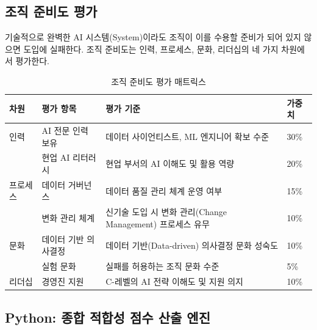 \subsection{조직 준비도 평가}
\label{sec:8.1.4}

기술적으로 완벽한 AI 시스템(System)이라도 조직이 이를 수용할 준비가 되어 있지 않으면 도입에 실패한다. 조직 준비도는 인력, 프로세스, 문화, 리더십의 네 가지 차원에서 평가한다.

\begin{table}[htbp]
\centering
\caption{조직 준비도 평가 매트릭스}
\label{tab:org_readiness}
\begin{tabularx}{\textwidth}{p{2cm}p{3cm}Xp{2cm}}
\toprule
\textbf{차원} & \textbf{평가 항목} & \textbf{평가 기준} & \textbf{가중치} \\
\midrule
인력 & AI 전문 인력 보유 & 데이터 사이언티스트, ML 엔지니어 확보 수준 & 30\% \\
& 현업 AI 리터러시 & 현업 부서의 AI 이해도 및 활용 역량 & 20\% \\
\midrule
프로세스 & 데이터 거버넌스 & 데이터 품질 관리 체계 운영 여부 & 15\% \\
& 변화 관리 체계 & 신기술 도입 시 변화 관리(Change Management) 프로세스 유무 & 10\% \\
\midrule
문화 & 데이터 기반 의사결정 & 데이터 기반(Data-driven) 의사결정 문화 성숙도 & 10\% \\
& 실험 문화 & 실패를 허용하는 조직 문화 수준 & 5\% \\
\midrule
리더십 & 경영진 지원 & C-레벨의 AI 전략 이해도 및 지원 의지 & 10\% \\
\bottomrule
\end{tabularx}
\end{table}

\subsection{Python: 종합 적합성 점수 산출 엔진}
\label{sec:8.1.5}

